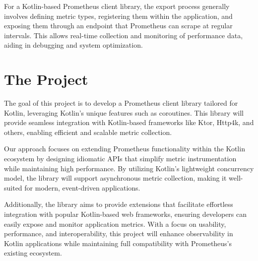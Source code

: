 \documentclass[a4paper,twoside,11pt]{article}
\begin{document}
For a Kotlin-based Prometheus client library, the export process generally involves defining metric types, registering them within the application, and exposing them through an endpoint that Prometheus can scrape at regular intervals. This allows real-time collection and monitoring of performance data, aiding in debugging and system optimization.

\section{The Project}

The goal of this project is to develop a Prometheus client library tailored for Kotlin, leveraging Kotlin's unique features such as coroutines. This library will provide seamless integration with Kotlin-based frameworks like Ktor, Http4k, and others, enabling efficient and scalable metric collection.

Our approach focuses on extending Prometheus functionality within the Kotlin ecosystem by designing idiomatic APIs that simplify metric instrumentation while maintaining high performance. By utilizing Kotlin’s lightweight concurrency model, the library will support asynchronous metric collection, making it well-suited for modern, event-driven applications.

Additionally, the library aims to provide extensions that facilitate effortless integration with popular Kotlin-based web frameworks, ensuring developers can easily expose and monitor application metrics. With a focus on usability, performance, and interoperability, this project will enhance observability in Kotlin applications while maintaining full compatibility with Prometheus’s existing ecosystem.
\end{document}
